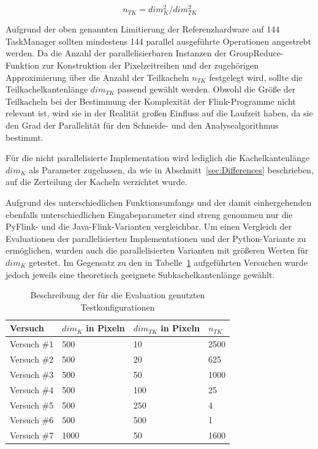 \begin{equation} \label{eq:numberOfSubtiles}
n_{TK} = {dim_{K}^2} / {dim_{TK}^2}
\end{equation}

Aufgrund der oben genannten Limitierung der Referenzhardware auf 144 TaskManager sollten mindestens 144 parallel ausgeführte Operationen angestrebt werden. Da die Anzahl der parallelisierbaren Instanzen der GroupReduce-Funktion zur Konstruktion der Pixelzeitreihen und der zugehörigen Approximierung über die Anzahl der Teilkacheln $n_{TK}$ festgelegt wird, sollte die Teilkachelkantenlänge $dim_{TK}$ passend gewählt werden. Obwohl die Größe der Teilkacheln bei der Bestimmung der Komplexität der Flink-Programme nicht relevant ist, wird sie in der Realität großen Einfluss auf die Laufzeit haben, da sie den Grad der Parallelität für den Schneide- und den Analysealgorithmus bestimmt.

Für die nicht parallelisierte Implementation wird lediglich die Kachelkantenlänge $dim_K$ als Parameter zugelassen, da wie in Abschnitt~\ref{sec:Differences} beschrieben, auf die Zerteilung der Kacheln verzichtet wurde.

Aufgrund des unterschiedlichen Funktionsumfangs und der damit einhergehenden ebenfalls unterschiedlichen Eingabeparameter sind streng genommen nur die PyFlink- und die Java-Flink-Varianten vergleichbar. Um einen Vergleich der Evaluationen der parallelisierten Implementationen und der Python-Variante zu ermöglichen, wurden auch die parallelisierten Varianten mit größeren Werten für $dim_K$ getestet. Im Gegensatz zu den in Tabelle~\ref{tab:descriptionTestSetting} aufgeführten Versuchen wurde jedoch jeweils eine theoretisch geeignete Subkachelkantenlänge gewählt. 

\begin{table}[position specifier]
          \centering
          \begin{tabular}{| p{2cm} | p{3cm} | p{3cm} | p{3cm} |}
          	\hline
                  Versuch & $dim_K$ in Pixeln & $dim_{TK}$ in Pixeln & $n_{TK}$ \\
                  \hline
                  Versuch \#1 & 500 & 10 & 2500 \\
                  \hline
                  Versuch \#2 & 500 & 20 & 625 \\
                  \hline
                  Versuch \#3 & 500 & 50 & 1000 \\
                  \hline
                  Versuch \#4 & 500 & 100 & 25 \\
                  \hline
                  Versuch \#5 & 500 & 250 & 4 \\
                  \hline
                  Versuch \#6 & 500 & 500 & 1 \\
                  \hline
                  Versuch \#7 & 1000 & 50 & 1600 \\
                  \hline

          \end{tabular}
          \caption{Beschreibung der für die Evaluation genutzten Testkonfigurationen}
          \label{tab:descriptionTestSetting}
\end{table}


